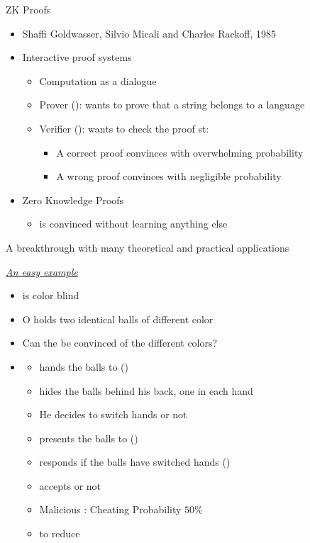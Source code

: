 \documentclass[handouts]{beamer}
\begin{document}
\begin{frame}{ZK Proofs}
\begin{itemize}
\item Shaffi Goldwasser, Silvio Micali and Charles Rackoff, 1985
\pause
\item Interactive proof systems
\pause
\begin{itemize}
\item Computation as a dialogue
\pause
\item Prover (\prv): wants to prove that a string belongs to a language
\pause
\item Verifier (\ver): wants to check the proof st: 
\pause
\begin{itemize}
\item A correct proof convinces \ver with overwhelming probability
\item A wrong proof convinces \ver with negligible probability
\end{itemize}
\end{itemize}
\item Zero Knowledge Proofs
\begin{itemize}
\item \ver is convinced without learning anything else
\end{itemize}
\pause
\end{itemize}
A breakthrough with many theoretical and practical applications
\end{frame}

\begin{frame}{\textit{\href{http://mathoverflow.net/questions/22624/example-of-a-good-zero-knowledge-proof}{An easy example}}}
\begin{itemize}
\item \ver is color blind
\pause
\item O \prv holds two identical balls of different color
\pause
\item Can the \ver be convinced of the different colors? 
\pause
\item {}
\begin{itemize}
\item \prv hands the balls to \ver ()
\item \ver hides the balls behind his back, one in each hand
\pause
\item He  decides to switch hands or not
\pause
\item \ver presents the balls to \prv ()
\pause
\item \prv responds if the balls have switched hands ()
\pause
\item \ver accepts or not
\pause
\item Malicious \prv: Cheating Probability $50\%$
\pause
\item {} to reduce
\end{itemize}
\end{itemize}
\end{frame}
\end{document}
